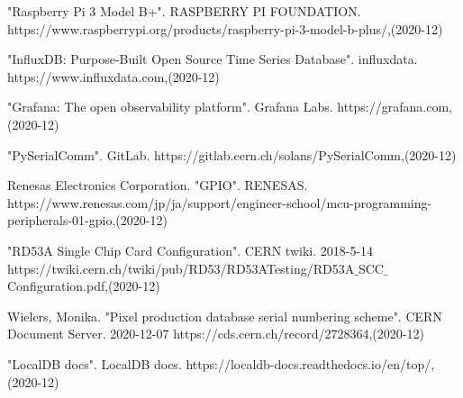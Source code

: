 \begin{thebibliography}{9}
"Raspberry Pi 3 Model B+". RASPBERRY PI FOUNDATION. 
https://www.raspberrypi.org/products/raspberry-pi-3-model-b-plus/,(2020-12)

"InfluxDB: Purpose-Built Open Source Time Series Database". influxdata. 
https://www.influxdata.com,(2020-12)

"Grafana: The open observability platform". Grafana Labs. 
https://grafana.com,(2020-12)

"PySerialComm". GitLab. 
https://gitlab.cern.ch/solans/PySerialComm,(2020-12)

Renesas Electronics Corporation. "GPIO". RENESAS.  
https://www.renesas.com/jp/ja/support/engineer-school/mcu-programming-peripherals-01-gpio,(2020-12)

"RD53A Single Chip Card Configuration". CERN twiki. 2018-5-14 
https://twiki.cern.ch/twiki/pub/RD53/RD53ATesting/RD53A$\_$SCC$\_$Configuration.pdf,(2020-12)

Wielers, Monika. "Pixel production database serial numbering scheme". CERN Document Server. 2020-12-07
https://cds.cern.ch/record/2728364,(2020-12)

"LocalDB docs". LocalDB docs. 
https://localdb-docs.readthedocs.io/en/top/,(2020-12)

\end{thebibliography}
